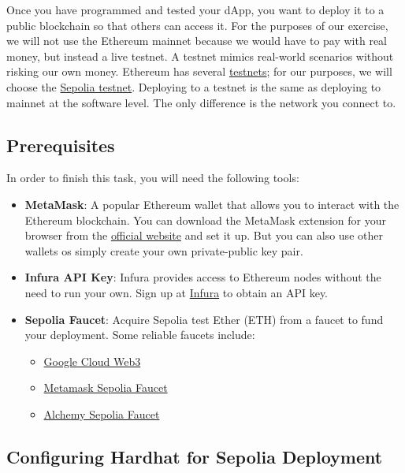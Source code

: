 \documentclass[12pt]{article}
\begin{document}
Once you have programmed and tested your dApp, you want to deploy it to a public blockchain so that others can access it. For the purposes of our exercise, we will not use the Ethereum mainnet because we would have to pay with real money, but instead a live testnet. A testnet mimics real-world scenarios without risking our own money. Ethereum has several \href{https://ethereum.org/en/developers/docs/networks/#ethereum-testnets}{testnets}; for our purposes, we will choose the \href{https://sepolia.dev/}{Sepolia testnet}. Deploying to a testnet is the same as deploying to mainnet at the software level. The only difference is the network you connect to.

\subsection{Prerequisites}

In order to finish this task, you will need the following tools:

\begin{itemize}
    \item \textbf{MetaMask}: A popular Ethereum wallet that allows you to interact with the Ethereum blockchain. You can download the MetaMask extension for your browser from the \href{https://metamask.io/}{official website} and set it up. But you can also use other wallets os simply create your own private-public key pair.
    
    \item \textbf{Infura API Key}: Infura provides access to Ethereum nodes without the need to run your own. Sign up at \href{https://infura.io/}{Infura} to obtain an API key.
    
    \item \textbf{Sepolia Faucet}: Acquire Sepolia test Ether (ETH) from a faucet to fund your deployment. Some reliable faucets include:
    \begin{itemize}
        \item \href{https://cloud.google.com/application/web3/faucet/ethereum/sepolia}{Google Cloud Web3}
        \item \href{https://docs.metamask.io/developer-tools/faucet/}{Metamask Sepolia Faucet}
        \item \href{https://www.alchemy.com/faucets/ethereum-sepolia}{Alchemy Sepolia Faucet}
    \end{itemize}
\end{itemize}


\subsection{Configuring Hardhat for Sepolia Deployment}
\end{document}
